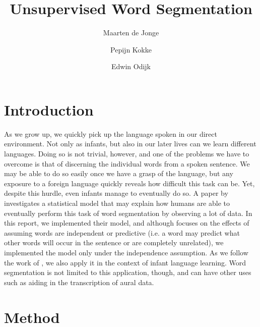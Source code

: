 \documentclass[11pt]{article}
\title{Unsupervised Word Segmentation}
\author{Maarten de Jonge \and Pepijn Kokke \and Edwin Odijk}
\date{}
\begin{document}
\maketitle

\begin{abstract}
\end{abstract}

\section{Introduction}
As we grow up, we quickly pick up the language spoken in our direct environment. Not only as infants, but also in our later lives can we learn different languages. Doing so is not trivial, however, and one of the problems we have to overcome is that of discerning the individual words from a spoken sentence. We may be able to do so easily once we have a grasp of the language, but any exposure to a foreign language quickly reveals how difficult this task can be. Yet, despite this hurdle, even infants manage to eventually do so. A paper by \cite{goldwater2009} investigates a statistical model that may explain how humans are able to eventually perform this task of word segmentation by observing a lot of data. In this report, we implemented their model, and although \cite{goldwater2009} focuses on the effects of assuming words are independent or predictive (i.e. a word may predict what other words will occur in the sentence or are completely unrelated), we implemented the model only under the independence assumption. As we follow the work of \cite{goldwater2009}, we also apply it in the context of infant language learning. Word segmentation is not limited to this application, though, and can have other uses such as aiding in the transcription of aural data.

\section{Method}
\end{document}
